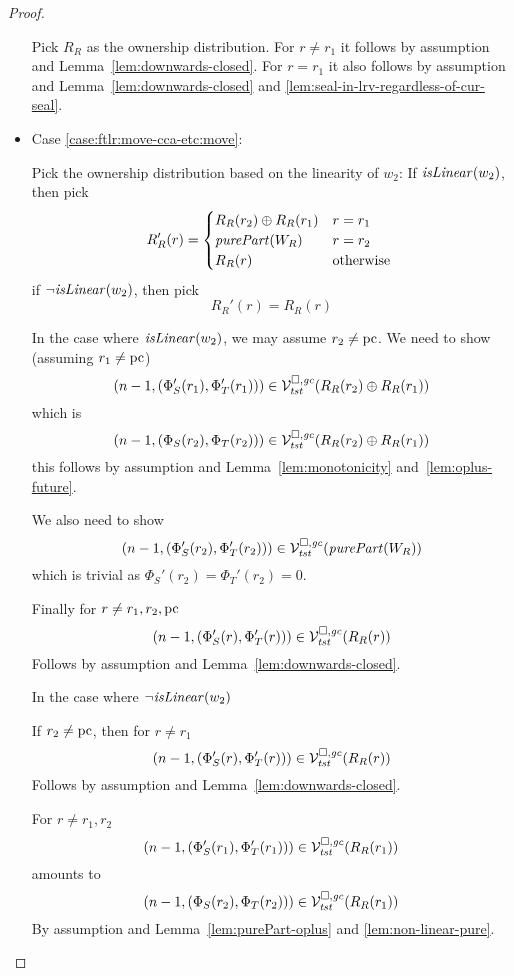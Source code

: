 \begin{proof}
\begin{itemize}
    Pick $R_R$ as the ownership distribution.
    For $r \neq r_1$ it follows by assumption and Lemma~\ref{lem:downwards-closed}.
    For $r = r_1$ it also follows by assumption and Lemma~\ref{lem:downwards-closed} and \ref{lem:seal-in-lrv-regardless-of-cur-seal}.

  \item Case \ref{case:ftlr:move-cca-etc:move}:

    Pick the ownership distribution based on the linearity of $w_2$: If $\isLinear{w_2}$, then pick
    \[
      R_R'(r) =
      \begin{cases}
        R_R(r_2) \oplus R_R(r_1) & r = r_1 \\
        \purePart{W_R}         & r = r_2 \\
        R_R(r)                 & \totherwise
      \end{cases}
    \]
    if $\neg \isLinear{w_2}$, then pick
    \[
      R_R'(r) = R_R(r)
    \]

    In the case where $\isLinear{w_2}$, we may assume $r_2 \neq \pcreg$. We need to show (assuming $r_1 \neq \pcreg$)
    \[
      \npair[n-1]{(\Phi_S'(r_1),\Phi_T'(r_1))} \in \lrvg{\trust}(R_R(r_2) \oplus R_R(r_1))
    \]
    which is 
    \[
      \npair[n-1]{(\Phi_S(r_2),\Phi_T(r_2))} \in \lrvg{\trust}(R_R(r_2) \oplus R_R(r_1))
    \]
    this follows by assumption and Lemma~\ref{lem:monotonicity} and~\ref{lem:oplus-future}.

    We also need to show
    \[
      \npair[n-1]{(\Phi_S'(r_2),\Phi_T'(r_2))} \in \lrvg{\trust}(\purePart{W_R})
    \]
    which is trivial as $\Phi_S'(r_2) = \Phi_T'(r_2) = 0$. 

    Finally for $r \neq r_1,r_2,\pcreg$ 
    \[
      \npair[n-1]{(\Phi_S'(r),\Phi_T'(r))} \in \lrvg{\trust}(R_R(r))
    \]
    Follows by assumption and Lemma~\ref{lem:downwards-closed}.

    In the case where $\neg \isLinear{w_2}$

    If $r_2 \neq \pcreg$, then for $r \neq r_1$
    \[
      \npair[n-1]{(\Phi_S'(r),\Phi_T'(r))} \in \lrvg{\trust}(R_R(r))
    \]
    Follows by assumption and Lemma~\ref{lem:downwards-closed}.
    
    For $r \neq r_1,r_2$
    \[
      \npair[n-1]{(\Phi_S'(r_1),\Phi_T'(r_1))} \in \lrvg{\trust}(R_R(r_1))
    \]
    amounts to
    \[
      \npair[n-1]{(\Phi_S(r_2),\Phi_T(r_2))} \in \lrvg{\trust}(R_R(r_1))
    \]
    By assumption and Lemma~\ref{lem:purePart-oplus} and \ref{lem:non-linear-pure}.


\end{itemize}
\end{proof}
